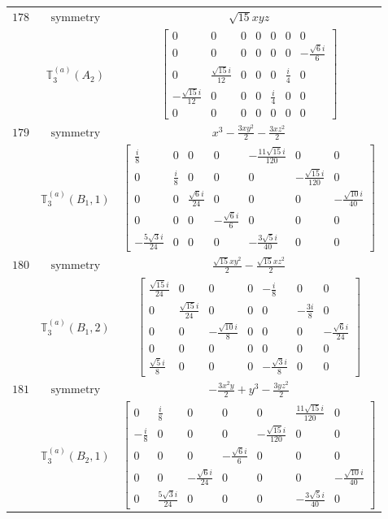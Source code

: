 \documentclass[fleqn,8pt,landscape]{jsarticle}
\begin{document}
\begin{longtable}{ccc}
$ 178 $ & $ \text{symmetry} $ & $ \sqrt{15} x y z $ \\
$  $ & $ \mathbb{T}_{3}^{(a)}(A_{2}) $ & $ \begin{bmatrix} 0 & 0 & 0 & 0 & 0 & 0 & 0 \\ 0 & 0 & 0 & 0 & 0 & 0 & - \frac{\sqrt{6} i}{6} \\ 0 & \frac{\sqrt{15} i}{12} & 0 & 0 & 0 & \frac{i}{4} & 0 \\ - \frac{\sqrt{15} i}{12} & 0 & 0 & 0 & \frac{i}{4} & 0 & 0 \\ 0 & 0 & 0 & 0 & 0 & 0 & 0 \end{bmatrix} $ \\ \hline
$ 179 $ & $ \text{symmetry} $ & $ x^{3} - \frac{3 x y^{2}}{2} - \frac{3 x z^{2}}{2} $ \\
$  $ & $ \mathbb{T}_{3}^{(a)}(B_{1},1) $ & $ \begin{bmatrix} \frac{i}{8} & 0 & 0 & 0 & - \frac{11 \sqrt{15} i}{120} & 0 & 0 \\ 0 & \frac{i}{8} & 0 & 0 & 0 & - \frac{\sqrt{15} i}{120} & 0 \\ 0 & 0 & \frac{\sqrt{6} i}{24} & 0 & 0 & 0 & - \frac{\sqrt{10} i}{40} \\ 0 & 0 & 0 & - \frac{\sqrt{6} i}{6} & 0 & 0 & 0 \\ - \frac{5 \sqrt{3} i}{24} & 0 & 0 & 0 & - \frac{3 \sqrt{5} i}{40} & 0 & 0 \end{bmatrix} $ \\ \hline
$ 180 $ & $ \text{symmetry} $ & $ \frac{\sqrt{15} x y^{2}}{2} - \frac{\sqrt{15} x z^{2}}{2} $ \\
$  $ & $ \mathbb{T}_{3}^{(a)}(B_{1},2) $ & $ \begin{bmatrix} \frac{\sqrt{15} i}{24} & 0 & 0 & 0 & - \frac{i}{8} & 0 & 0 \\ 0 & \frac{\sqrt{15} i}{24} & 0 & 0 & 0 & - \frac{3 i}{8} & 0 \\ 0 & 0 & - \frac{\sqrt{10} i}{8} & 0 & 0 & 0 & - \frac{\sqrt{6} i}{24} \\ 0 & 0 & 0 & 0 & 0 & 0 & 0 \\ \frac{\sqrt{5} i}{8} & 0 & 0 & 0 & - \frac{\sqrt{3} i}{8} & 0 & 0 \end{bmatrix} $ \\ \hline
$ 181 $ & $ \text{symmetry} $ & $ - \frac{3 x^{2} y}{2} + y^{3} - \frac{3 y z^{2}}{2} $ \\
$  $ & $ \mathbb{T}_{3}^{(a)}(B_{2},1) $ & $ \begin{bmatrix} 0 & \frac{i}{8} & 0 & 0 & 0 & \frac{11 \sqrt{15} i}{120} & 0 \\ - \frac{i}{8} & 0 & 0 & 0 & - \frac{\sqrt{15} i}{120} & 0 & 0 \\ 0 & 0 & 0 & - \frac{\sqrt{6} i}{6} & 0 & 0 & 0 \\ 0 & 0 & - \frac{\sqrt{6} i}{24} & 0 & 0 & 0 & - \frac{\sqrt{10} i}{40} \\ 0 & \frac{5 \sqrt{3} i}{24} & 0 & 0 & 0 & - \frac{3 \sqrt{5} i}{40} & 0 \end{bmatrix} $ \\ \hline

\end{longtable}
\end{document}
